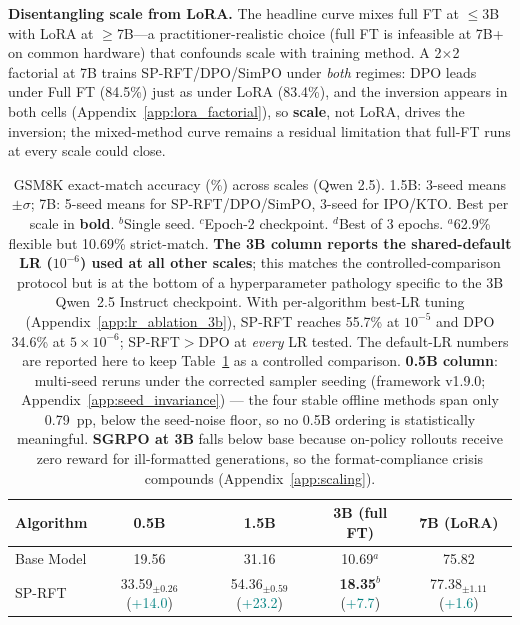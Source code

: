 \documentclass{article}
\newcommand{\sprft}{SP-RFT}
\begin{document}
\textbf{Disentangling scale from LoRA.}
The headline curve mixes full FT at $\leq$3B with LoRA at $\geq$7B---a practitioner-realistic choice (full FT is infeasible at 7B+ on common hardware) that confounds scale with training method. A 2$\times$2 factorial at 7B trains \sprft{}/DPO/SimPO under \emph{both} regimes: DPO leads under Full FT (84.5\%) just as under LoRA (83.4\%), and the inversion appears in both cells (Appendix~\ref{app:lora_factorial}), so \textbf{scale}, not LoRA, drives the inversion; the mixed-method curve remains a residual limitation that full-FT runs at every scale could close.

\begin{table}[t]
\centering
\caption{GSM8K exact-match accuracy (\%) across scales (Qwen 2.5). 1.5B: 3-seed means $\pm \sigma$; 7B: 5-seed means for \sprft{}/DPO/SimPO, 3-seed for IPO/KTO. Best per scale in \textbf{bold}. $^b$Single seed. $^c$Epoch-2 checkpoint. $^d$Best of 3 epochs. $^a$62.9\% flexible but 10.69\% strict-match. \textbf{The 3B column reports the shared-default LR ($10^{-6}$) used at all other scales}; this matches the controlled-comparison protocol but is at the bottom of a hyperparameter pathology specific to the 3B Qwen~2.5 Instruct checkpoint. With per-algorithm best-LR tuning (Appendix~\ref{app:lr_ablation_3b}), \sprft{} reaches 55.7\% at $10^{-5}$ and DPO 34.6\% at $5{\times}10^{-6}$; \sprft{}$>$DPO at \emph{every} LR tested. The default-LR numbers are reported here to keep Table~\ref{tab:main_results} as a controlled comparison. \textbf{0.5B column}: multi-seed reruns under the corrected sampler seeding (framework v1.9.0; Appendix~\ref{app:seed_invariance}) --- the four stable offline methods span only 0.79~pp, below the seed-noise floor, so no 0.5B ordering is statistically meaningful. \textbf{SGRPO at 3B} falls below base because on-policy rollouts receive zero reward for ill-formatted generations, so the format-compliance crisis compounds (Appendix~\ref{app:scaling}).}
\label{tab:main_results}
\small
\begin{tabular}{@{}lcccc@{}}
\toprule
\textbf{Algorithm} & \textbf{0.5B} & \textbf{1.5B} & \textbf{3B (full FT)} & \textbf{7B (LoRA)} \\
\midrule
Base Model & 19.56 & 31.16 & 10.69$^a$ & 75.82 \\
\midrule
\sprft{} & 33.59$_{\pm 0.26}$ \small{(\textcolor{teal}{+14.0})} & 54.36$_{\pm 0.59}$ \small{(\textcolor{teal}{+23.2})} & \textbf{18.35}$^b$ \small{(\textcolor{teal}{+7.7})} & 77.38$_{\pm 1.11}$ \small{(\textcolor{teal}{+1.6})} \\

\end{tabular}
\end{table}
\end{document}
